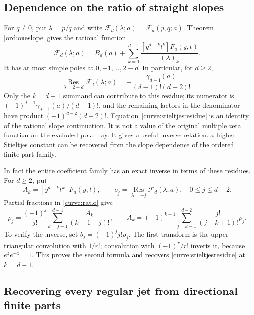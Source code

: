 \documentclass[11pt,letterpaper]{article}
\numberwithin{equation}{section}
\theoremstyle{definition}
\theoremstyle{remark}
\begin{document}
\subsection{Dependence on the ratio of straight slopes}

For $q\ne0$, put $\lambda=p/q$ and write
$\mathcal F_d(\lambda;a)=\mathcal F_d(p,q;a)$. Theorem
\ref{ord:oneslope} gives the rational function
\begin{equation}\label{curve:ratio}
 \mathcal F_d(\lambda;a)=B_d(a)+
  \sum_{k=1}^{d-1}\frac{[y^{d-k}t^k]F_a(y,t)}{(\lambda)_k}.
\end{equation}
It has at most simple poles at $0,-1,\ldots,2-d$. In particular,
for $d\ge2$,
\begin{equation}\label{curve:stieltjesresidue}
 \boxed{\displaystyle
 \operatorname*{Res}_{\lambda=2-d}\mathcal F_d(\lambda;a)
 =-\frac{\gamma_{d-1}(a)}{(d-1)!(d-2)!}.}
\end{equation}
Only the $k=d-1$ summand can contribute to this residue; its numerator
is $(-1)^{d-1}\gamma_{d-1}(a)/(d-1)!$, and the remaining factors in
the denominator have product $(-1)^{d-2}(d-2)!$.
Equation~\eqref{curve:stieltjesresidue} is an identity of the rational
slope continuation. It is not a value of the original multiple zeta
function on the excluded polar ray. It gives a useful inverse
relation: a higher Stieltjes constant can be recovered from the
slope dependence of the ordered finite-part family.

In fact the entire coefficient family has an exact inverse in terms
of these residues. For $d\ge2$, put
\[
 A_k=[y^{d-k}t^k]F_a(y,t),\qquad
 \rho_j=\operatorname*{Res}_{\lambda=-j}\mathcal F_d(\lambda;a),
 \quad 0\le j\le d-2.
\]
Partial fractions in \eqref{curve:ratio} give
\begin{equation}\label{curve:residuetransform}
 \rho_j=\frac{(-1)^j}{j!}
          \sum_{k=j+1}^{d-1}\frac{A_k}{(k-1-j)!},\qquad
 \boxed{A_k=(-1)^{k-1}\sum_{j=k-1}^{d-2}
                   \frac{j!}{(j-k+1)!}\rho_j.}
\end{equation}
To verify the inverse, set $b_j=(-1)^j j!\rho_j$. The first transform
is the upper-triangular convolution with $1/r!$; convolution with
$(-1)^r/r!$ inverts it, because $e^z e^{-z}=1$. This proves the second
formula and recovers \eqref{curve:stieltjesresidue} at $k=d-1$.

\subsection{Recovering every regular jet from directional finite parts}
\end{document}
